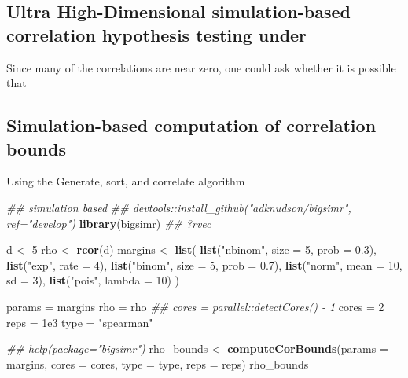 \documentclass[
]{article}
\newenvironment{Shaded}{\begin{snugshade}}{\end{snugshade}}
\newcommand{\CommentTok}[1]{\textcolor[rgb]{0.56,0.35,0.01}{\textit{#1}}}
\newcommand{\DataTypeTok}[1]{\textcolor[rgb]{0.13,0.29,0.53}{#1}}
\newcommand{\DecValTok}[1]{\textcolor[rgb]{0.00,0.00,0.81}{#1}}
\newcommand{\FloatTok}[1]{\textcolor[rgb]{0.00,0.00,0.81}{#1}}
\newcommand{\KeywordTok}[1]{\textcolor[rgb]{0.13,0.29,0.53}{\textbf{#1}}}
\newcommand{\NormalTok}[1]{#1}
\newcommand{\StringTok}[1]{\textcolor[rgb]{0.31,0.60,0.02}{#1}}
\begin{document}
\hypertarget{ultra-high-dimensional-simulation-based-correlation-hypothesis-testing-under}{%
\subsection{Ultra High-Dimensional simulation-based correlation hypothesis testing under}\label{ultra-high-dimensional-simulation-based-correlation-hypothesis-testing-under}}

Since many of the correlations are near zero, one could ask whether it is
possible that

\hypertarget{simulation-based-computation-of-correlation-bounds}{%
\subsection{Simulation-based computation of correlation bounds}\label{simulation-based-computation-of-correlation-bounds}}

Using the Generate, sort, and correlate algorithm \citet{Demirtas2011}

\begin{Shaded}
\begin{Highlighting}[]

\CommentTok{\#\# simulation based}
\CommentTok{\#\# devtools::install\_github("adknudson/bigsimr", ref="develop")}
\KeywordTok{library}\NormalTok{(bigsimr)}
\CommentTok{\#\# ?rvec}

\NormalTok{d \textless{}{-}}\StringTok{ }\DecValTok{5}
\NormalTok{rho \textless{}{-}}\StringTok{ }\KeywordTok{rcor}\NormalTok{(d)}
\NormalTok{margins \textless{}{-}}\StringTok{ }\KeywordTok{list}\NormalTok{(}
    \KeywordTok{list}\NormalTok{(}\StringTok{"nbinom"}\NormalTok{, }\DataTypeTok{size =} \DecValTok{5}\NormalTok{, }\DataTypeTok{prob =} \FloatTok{0.3}\NormalTok{),}
    \KeywordTok{list}\NormalTok{(}\StringTok{"exp"}\NormalTok{, }\DataTypeTok{rate =} \DecValTok{4}\NormalTok{),}
    \KeywordTok{list}\NormalTok{(}\StringTok{"binom"}\NormalTok{, }\DataTypeTok{size =} \DecValTok{5}\NormalTok{, }\DataTypeTok{prob =} \FloatTok{0.7}\NormalTok{),}
    \KeywordTok{list}\NormalTok{(}\StringTok{"norm"}\NormalTok{, }\DataTypeTok{mean =} \DecValTok{10}\NormalTok{, }\DataTypeTok{sd =} \DecValTok{3}\NormalTok{),}
    \KeywordTok{list}\NormalTok{(}\StringTok{"pois"}\NormalTok{, }\DataTypeTok{lambda =} \DecValTok{10}\NormalTok{)}
\NormalTok{)}
 
\NormalTok{params =}\StringTok{ }\NormalTok{margins}
\NormalTok{rho =}\StringTok{ }\NormalTok{rho}
\CommentTok{\#\# cores = parallel::detectCores() {-} 1}
\NormalTok{cores =}\StringTok{ }\DecValTok{2}
\NormalTok{reps =}\StringTok{ }\FloatTok{1e3}
\NormalTok{type =}\StringTok{ "spearman"}

\CommentTok{\#\# help(package="bigsimr")}
\NormalTok{rho\_bounds \textless{}{-}}\StringTok{ }\KeywordTok{computeCorBounds}\NormalTok{(}\DataTypeTok{params =}\NormalTok{ margins, }\DataTypeTok{cores =}\NormalTok{ cores, }\DataTypeTok{type =}\NormalTok{ type, }\DataTypeTok{reps =}\NormalTok{ reps)}
\NormalTok{rho\_bounds}
\end{Highlighting}
\end{Shaded}
\end{document}
